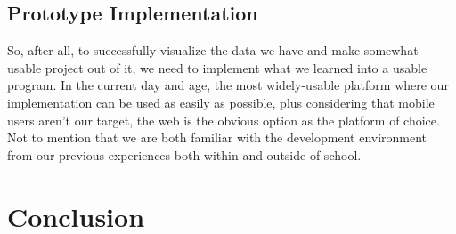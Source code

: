 \documentclass[11pt]{article}
\begin{document}

\subsection {Prototype Implementation}


So, after all, to successfully visualize the data we have and make somewhat usable project out of it, we need to implement what we learned into a usable program. In the current day and age, the most widely-usable platform where our implementation can be used as easily as possible, plus considering that mobile users aren't our target, the web is the obvious option as the platform of choice. Not to mention that we are both familiar with the development environment from our previous experiences both within and outside of school.

\section {Conclusion} 

\end{document}
